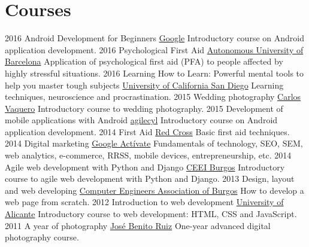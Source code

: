 \documentclass[]{friggeri-cv}
\begin{document}
\section{Courses}
\begin{entrylist}
  \entry
    {2016}
    {Android Development for Beginners}
    {\href{https://www.udacity.com/course/android-development-for-beginners--ud837}{Google}}
    {Introductory course on Android application development.}
  \entry
    {2016}
    {Psychological First Aid}
    {\href{https://www.coursera.org/learn/pap}{Autonomous University of Barcelona}}
    {Application of psychological first aid (PFA) to people affected by highly stressful situations.}
  \entry
    {2016}
    {Learning How to Learn: Powerful mental tools to help you master tough subjects}
    {\href{https://coursera.org/learn/learning-how-to-learn/}{University of California San Diego}}
    {Learning techniques, neuroscience and procrastination.}
  \entry
    {2015}
    {Wedding photography}
    {\href{http://www.carlosvaquero.es/}{Carlos Vaquero}}
    {Introductory course to wedding photography.}
  \entry
    {2015}
    {Development of mobile applications with Android}
    {\href{http://agilecyl.org/}{agilecyl}}
    {Introductory course on Android application development.}
  \entry
    {2014}
    {First Aid}
    {\href{http://www.cruzroja.es/}{Red Cross}}
    {Basic first aid techniques.}
  \entry
    {2014}
    {Digital marketing}
    {\href{https://www.google.es/landing/activate/}{Google Actívate}} 
    {Fundamentals of technology, SEO, SEM, web analytics, e-commerce, RRSS, mobile devices, entrepreneurship, etc.}
  \entry
    {2014}
    {Agile web development with Python and Django}
    {\href{http://www.ceeiburgos.es/}{CEEI Burgos}} 
    {Introductory course to agile web development with Python and Django.}    
  \entry
    {2013}
    {Design, layout and web developing}
    {\href{http://abi2burgos.es/}{Computer Engineers Association of Burgos}}   
    {How to develop a web page from scratch.}     
  \entry
    {2012}
    {Introduction to web development}
    {\href{https://www.ua.es/}{University of Alicante}}  
    {Introductory course to web development: HTML, CSS and JavaScript.}     
  \entry
    {2011}
    {A year of photography}
    {\href{http://josebruiz.com/}{José Benito Ruiz}}    
    {One-year advanced digital photography course.}      
\end{entrylist}
\end{document}
